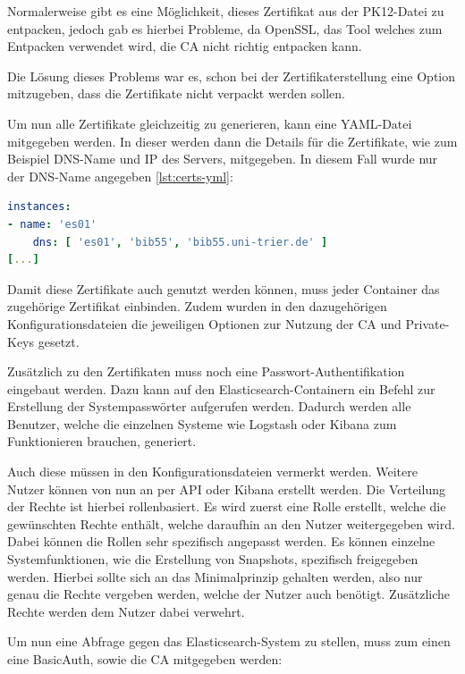 Normalerweise gibt es eine Möglichkeit, dieses Zertifikat aus der PK12-Datei zu entpacken, jedoch gab es hierbei Probleme, da OpenSSL, das Tool welches zum Entpacken verwendet wird, die CA nicht richtig entpacken kann. \cite{nerophon.2018}

Die Lösung dieses Problems war es, schon bei der Zertifikaterstellung eine Option mitzugeben, dass die Zertifikate nicht verpackt werden sollen. 

Um nun alle Zertifikate gleichzeitig zu generieren, kann eine YAML-Datei mitgegeben werden. In dieser werden dann die Details für die Zertifikate, wie zum Beispiel DNS-Name und IP des Servers, mitgegeben. In diesem Fall wurde nur der DNS-Name angegeben \ref{lst:certs-yml}:

\begin{lstlisting}[language=YAML, frame=single, label={lst:certs-yml}, caption=Auschnitt aus der Konfigurationsdatei für die Zertifikatgenerierung,captionpos=b] 
instances:
- name: 'es01'
	dns: [ 'es01', 'bib55', 'bib55.uni-trier.de' ]
[...]
\end{lstlisting}

Damit diese Zertifikate auch genutzt werden können, muss jeder Container das zugehörige Zertifikat einbinden. Zudem wurden in den dazugehörigen Konfigurationsdateien die jeweiligen Optionen zur Nutzung der CA und Private-Keys gesetzt.

Zusätzlich zu den Zertifikaten muss noch eine Passwort-Authentifikation eingebaut werden. Dazu kann auf den Elasticsearch-Containern ein Befehl zur Erstellung der Systempasswörter aufgerufen werden. Dadurch werden alle Benutzer, welche die einzelnen Systeme wie Logstash oder Kibana zum Funktionieren brauchen, generiert.

Auch diese müssen in den Konfigurationsdateien vermerkt werden. Weitere Nutzer können von nun an per API oder Kibana erstellt werden. Die Verteilung der Rechte ist hierbei rollenbasiert. Es wird zuerst eine Rolle erstellt, welche die gewünschten Rechte enthält, welche daraufhin an den Nutzer weitergegeben wird. Dabei können die Rollen sehr spezifisch angepasst werden. Es können einzelne Systemfunktionen, wie die Erstellung von Snapshots, spezifisch freigegeben werden. Hierbei sollte sich an das Minimalprinzip gehalten werden, also nur genau die Rechte vergeben werden, welche der Nutzer auch benötigt. Zusätzliche Rechte werden dem Nutzer dabei verwehrt.

Um nun eine Abfrage gegen das Elasticsearch-System zu stellen, muss zum einen eine BasicAuth, sowie die CA mitgegeben werden:

